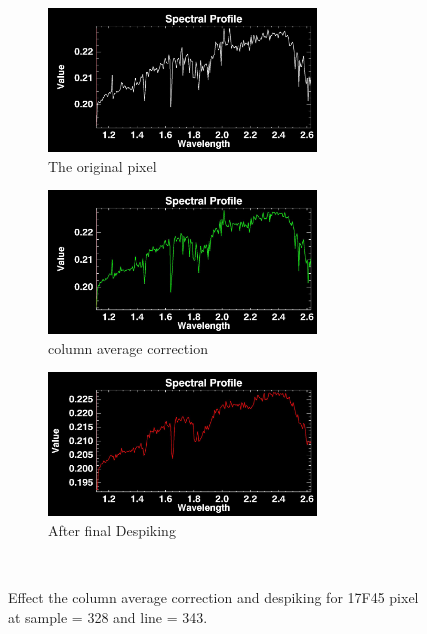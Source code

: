 \documentclass[pdftex, 12pt,a4paper,oneside]{report}
\begin{document}
\begin{figure}[!ht]
        \centering
        \begin{subfigure}[b]{0.2\textwidth}
                \centering
                \includegraphics[width=\textwidth, height=1.5in]{orig17F45_328_343.jpg}
                \caption{The original pixel}
                \label{fig:origPix_1}
        \end{subfigure}
        \qquad
        \quad
		\begin{subfigure}[b]{0.2\textwidth}
                \centering
                \includegraphics[width=\textwidth, height=1.5in]{avgCorr17F45_328_343.jpg}
                \caption{column average correction}
                \label{fig:avgCorr_1}
        \end{subfigure}   
        \qquad    
        \quad
        \begin{subfigure}[b]{0.2\textwidth}
                \centering
                \includegraphics[width=\textwidth, height=1.5in]{dspkavgCorr17F45_328_343.jpg}
                \caption{After final Despiking}
                \label{fig:dspkCorr_1}
        \end{subfigure}%
        ~ 
        
        \caption{Effect the column average correction and despiking for 17F45 pixel at sample = 328 and line = 343.}
               
\end{figure} 
\end{document}
